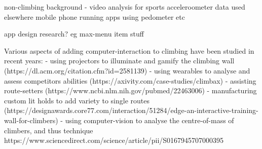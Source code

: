 non-climbing background
- video analysis for sports
acceleroometer data used elsewhere
mobile phone running apps using pedometer etc



app design research?
eg max-menu item stuff







Various aspects of adding computer-interaction to climbing have been studied in recent years: - using projectors to illuminate and gamify the climbing wall (https://dl.acm.org/citation.cfm?id=2581139) - using wearables to analyse and assess competitors abilities (https://axivity.com/case-studies/climbax) - assisting route-setters (https://www.ncbi.nlm.nih.gov/pubmed/22463006) - manufacturing custom lit holds to add variety to single routes (https://designawards.core77.com/interaction/51284/edge-an-interactive-training-wall-for-climbers) - using computer-vision to analyse the centre-of-mass of climbers, and thus technique https://www.sciencedirect.com/science/article/pii/S0167945707000395
